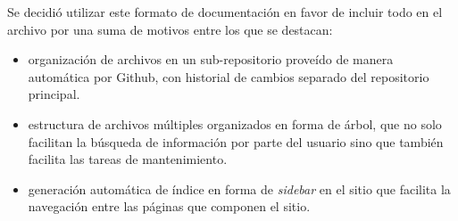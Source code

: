 Se decidió utilizar este formato de documentación en favor de incluir todo en el archivo  por una suma de motivos entre los que se destacan:

\begin{itemize}
  \item organización de archivos en un sub-repositorio proveído de manera automática por Github, con historial de cambios separado del repositorio principal.
  \item estructura de archivos múltiples organizados en forma de árbol, que no solo facilitan la búsqueda de información por parte del usuario sino que también facilita las tareas de mantenimiento.
  \item generación automática de índice en forma de \textit{sidebar} en el sitio que facilita la navegación entre las páginas que componen el sitio.
\end{itemize}
